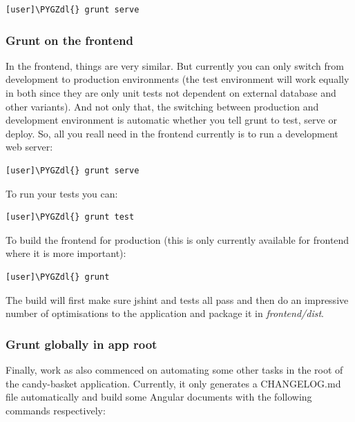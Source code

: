 \documentclass[letterpaper,10pt,english]{sphinxmanual}
\def\PYGZdl{\char`\$}
\begin{document}
\begin{Verbatim}[commandchars=\\\{\}]
[user]\PYGZdl{} grunt serve
\end{Verbatim}


\subsubsection{Grunt on the frontend}
\label{developer-guide:grunt-on-the-frontend}
In the frontend, things are very similar. But currently you can only
switch from development to production environments (the test
environment will work equally in both since they are only unit tests
not dependent on external database and other variants). And not only
that, the switching between production and development environment is
automatic whether you tell grunt to test, serve or deploy. So, all you
reall need in the frontend currently is to run a development web
server:

\begin{Verbatim}[commandchars=\\\{\}]
[user]\PYGZdl{} grunt serve
\end{Verbatim}

To run your tests you can:

\begin{Verbatim}[commandchars=\\\{\}]
[user]\PYGZdl{} grunt test
\end{Verbatim}

To build the frontend for production (this is only currently available
for frontend where it is more important):

\begin{Verbatim}[commandchars=\\\{\}]
[user]\PYGZdl{} grunt
\end{Verbatim}

The build will first make sure jshint and tests all pass and then do
an impressive number of optimisations to the application and package
it in \emph{frontend/dist}.


\subsubsection{Grunt globally in app root}
\label{developer-guide:grunt-globally-in-app-root}
Finally, work as also commenced on automating some other tasks in the
root of the candy-basket application. Currently, it only generates a
CHANGELOG.md file automatically and build some Angular documents with
the following commands respectively:
\end{document}
